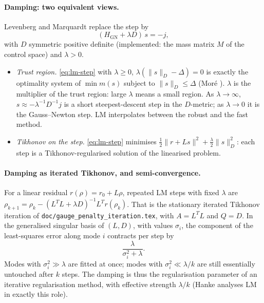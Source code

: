 \documentclass[11pt]{article}
\newcommand{\norm}[1]{\lVert #1 \rVert}
\begin{document}
\paragraph{Damping: two equivalent views.} Levenberg
\cite{Levenberg1944} and Marquardt \cite{Marquardt1963} replace the step
by
\begin{equation}
  (H_{\mathrm{GN}} + \lambda D)\,s = -j ,
  \label{eq:lm-step}
\end{equation}
with $D$ symmetric positive definite (implemented: the mass matrix $M$ of
the control space) and $\lambda > 0$.
\begin{itemize}
\item \emph{Trust region.} \eqref{eq:lm-step} with
  $\lambda \ge 0$, $\lambda(\norm{s}_D - \Delta) = 0$ is exactly the
  optimality system of $\min m(s)$ subject to $\norm{s}_D \le \Delta$
  (Mor\'e \cite{More1978}). $\lambda$ is the multiplier of the trust
  region: large $\lambda$ means a small region. As $\lambda\to\infty$,
  $s \approx -\lambda^{-1}D^{-1}j$ is a short steepest-descent step in the
  $D$-metric; as $\lambda\to0$ it is the Gauss--Newton step. LM
  interpolates between the robust and the fast method.
\item \emph{Tikhonov on the step.} \eqref{eq:lm-step} minimises
  $\tfrac12\norm{r + Ls}^2 + \tfrac\lambda2\norm{s}_D^2$: each step is a
  Tikhonov-regularised solution of the linearised problem.
\end{itemize}

\paragraph{Damping as iterated Tikhonov, and semi-convergence.} For a
linear residual $r(\rho) = r_0 + L\rho$, repeated LM steps with fixed
$\lambda$ are $\rho_{k+1} = \rho_k - (L^TL + \lambda D)^{-1}L^Tr(\rho_k)$.
That is the stationary iterated Tikhonov iteration of
\texttt{doc/gauge\_penalty\_iteration.tex}, with $A = L^TL$ and $Q = D$.
In the generalised singular basis of $(L, D)$, with values $\sigma_i$, the
component of the least-squares error along mode $i$ contracts per step by
\begin{equation}
  \frac{\lambda}{\sigma_i^2 + \lambda} .
\end{equation}
Modes with $\sigma_i^2 \gg \lambda$ are fitted at once; modes with
$\sigma_i^2 \ll \lambda/k$ are still essentially untouched after $k$
steps. The damping is thus the regularisation parameter of an iterative
regularisation method, with effective strength $\lambda/k$ (Hanke
\cite{Hanke1997} analyses LM in exactly this role).
\end{document}
